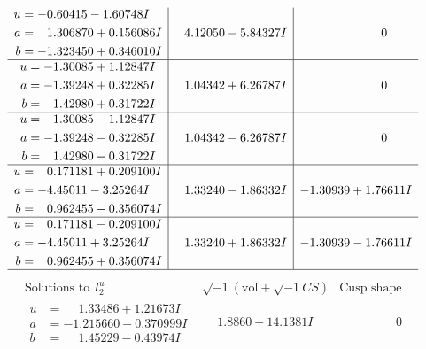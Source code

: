 \documentclass[1p]{elsarticle_modified}
\theoremstyle{definition}
\newcommand{\I}{\sqrt{-1}}
\begin{document}
$$\begin{array}{c|c|c}
\begin{aligned}
u &= -0.60415 - 1.60748 I \\
a &= \phantom{-}1.306870 + 0.156086 I \\
b &= -1.323450 + 0.346010 I\end{aligned}
 & \phantom{-}4.12050 - 5.84327 I & \phantom{-0.000000 } 0 \\ \hline\begin{aligned}
u &= -1.30085 + 1.12847 I \\
a &= -1.39248 + 0.32285 I \\
b &= \phantom{-}1.42980 + 0.31722 I\end{aligned}
 & \phantom{-}1.04342 + 6.26787 I & \phantom{-0.000000 } 0 \\ \hline\begin{aligned}
u &= -1.30085 - 1.12847 I \\
a &= -1.39248 - 0.32285 I \\
b &= \phantom{-}1.42980 - 0.31722 I\end{aligned}
 & \phantom{-}1.04342 - 6.26787 I & \phantom{-0.000000 } 0 \\ \hline\begin{aligned}
u &= \phantom{-}0.171181 + 0.209100 I \\
a &= -4.45011 - 3.25264 I \\
b &= \phantom{-}0.962455 - 0.356074 I\end{aligned}
 & \phantom{-}1.33240 - 1.86332 I & -1.30939 + 1.76611 I \\ \hline\begin{aligned}
u &= \phantom{-}0.171181 - 0.209100 I \\
a &= -4.45011 + 3.25264 I \\
b &= \phantom{-}0.962455 + 0.356074 I\end{aligned}
 & \phantom{-}1.33240 + 1.86332 I & -1.30939 - 1.76611 I\\
 \hline 
 \end{array}$$\newpage$$\begin{array}{c|c|c}  
\text{Solutions to }I^u_{2}& \I (\text{vol} + \sqrt{-1}CS) & \text{Cusp shape}\\
 \hline 
\begin{aligned}
u &= \phantom{-}1.33486 + 1.21673 I \\
a &= -1.215660 - 0.370999 I \\
b &= \phantom{-}1.45229 - 0.43974 I\end{aligned}
 & \phantom{-}1.8860 - 14.1381 I & \phantom{-0.000000 } 0 \\ \hline\begin{aligned}

\end{aligned}
\end{array}$$
\end{document}
